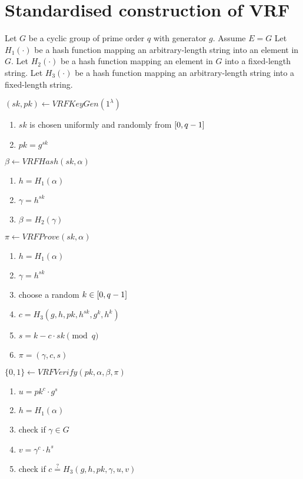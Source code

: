 \section{Standardised construction of VRF}

Let $G$ be a cyclic group of prime order $q$ with generator $g$. Assume $E = G$
Let $H_1(\cdot)$ be a hash function mapping an arbitrary-length string into an element in $G$.
Let $H_2(\cdot)$ be a hash function mapping an element in $G$ into a fixed-length string.
Let $H_3(\cdot)$ be a hash function mapping an arbitrary-length string into a fixed-length string.

$(sk, pk) \leftarrow VRFKeyGen(1^{\lambda})$
\begin{enumerate}
    \item $sk$ is chosen uniformly and randomly from $\interval{0}{q-1}$
    \item $pk = g^{sk}$
\end{enumerate}

$\beta \leftarrow VRFHash(sk, \alpha)$
\begin{enumerate}
    \item $h = H_{1}(\alpha)$
    \item $\gamma = h^{sk}$
    \item $\beta = H_{2}(\gamma)$
\end{enumerate}

$\pi \leftarrow VRFProve(sk, \alpha)$
\begin{enumerate}
    \item $h = H_{1}(\alpha)$
    \item $\gamma = h^{sk}$
    \item choose a random $k \in \interval{0}{q-1}$
    \item $c = H_{3}(g, h, pk, h^{sk}, g^{k}, h^{k})$
    \item $s = k - c \cdot sk \pmod{q}$
    \item $\pi = (\gamma, c, s)$
\end{enumerate}

$\{0, 1\} \leftarrow VRFVerify(pk, \alpha, \beta, \pi)$
\begin{enumerate}
    \item $u = pk^{c} \cdot g^{s}$
    \item $h = H_{1}(\alpha)$
    \item check if $\gamma \in G$
    \item $v = \gamma^{c} \cdot h^{s}$
    \item check if $c \stackrel{?}{=} H_{3}(g, h, pk, \gamma, u, v)$
\end{enumerate}
